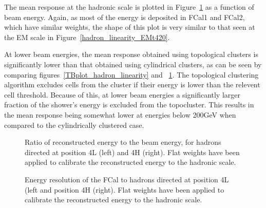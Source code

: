 The mean response at the hadronic scale is plotted in Figure~\ref{hadron_linearity_t420} as a function of beam energy. Again, as most of the energy is deposited in FCal1 and FCal2, which have similar weights, the shape of this plot is very similar to that seen at the EM scale in Figure~\ref{hadron_linearity_EMt420}. 

At lower beam energies, the mean response obtained using topological clusters is significantly lower than that obtained using cylindrical clusters, as can be seen by comparing figures~\ref{TBplot_hadron_linearity} and ~\ref{hadron_linearity_t420}. The topological clustering algorithm excludes cells from the cluster if their energy is lower than the relevent cell threshold. Because of this, at lower beam energies a significantly larger fraction of the shower's energy is excluded from the topocluster. This results in the mean response being somewhat lower at energies below 200GeV when compared to the cylindrically clustered case. 




\begin{figure}[!htb]
\begin{centering}
\caption{Ratio of reconstructed energy to the beam energy, for hadrons directed at position 4L (left) and 4H (right). Flat weights have been applied to calibrate the reconstructed energy to the hadronic scale.} 
\label{hadron_linearity_t420}
\end{centering}
\end{figure}



\begin{figure}[!htb]
\begin{centering}
\caption{Energy resolution of the FCal to hadrons directed at position 4L (left and position 4H (right). Flat weights have been applied to calibrate the reconstructed energy to the hadronic scale.} 
\label{hadron_resolution_t420}
\end{centering}
\end{figure}

